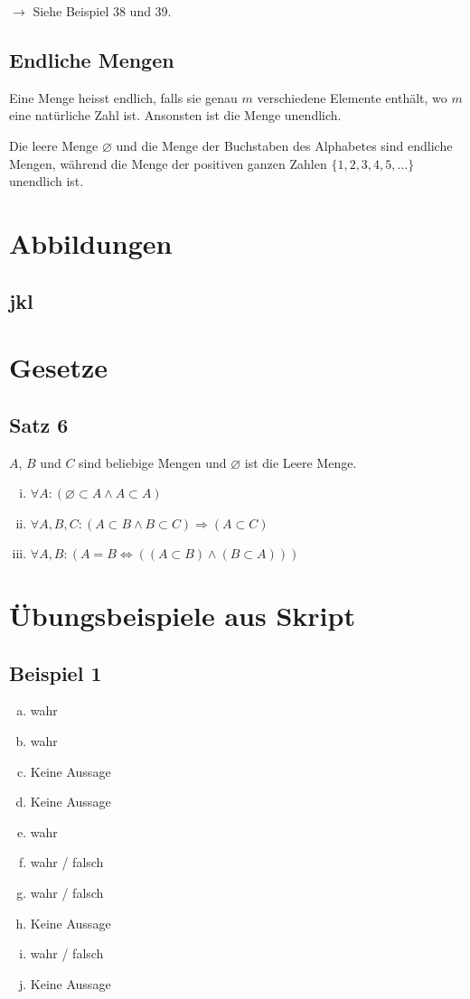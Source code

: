 \documentclass[12pt, a4paper, oneside]{article}
\begin{document}
$\rightarrow$ Siehe Beispiel 38 und 39.

\subsection{Endliche Mengen}
Eine Menge heisst endlich, falls sie genau $m$ verschiedene Elemente enthält, wo $m$ eine natürliche Zahl ist. Ansonsten ist die Menge unendlich.

Die leere Menge $\varnothing$ und die Menge der Buchstaben des Alphabetes sind endliche Mengen, während die Menge der positiven ganzen Zahlen $\{1, 2, 3, 4, 5,\dots\}$ unendlich ist.

\newpage
\section{Abbildungen}
\subsection{jkl}

%
%
\newpage
\section{Gesetze}
\subsection{Satz 6}
$A$, $B$ und $C$ sind beliebige Mengen und $\varnothing$ ist die Leere Menge.
\begin{enumerate}[(i)]
  \item $\forall A : (\varnothing \subset A \land A \subset A) $
  \item $\forall A, B, C : (A \subset B \land B \subset C) \Longrightarrow (A \subset C)$
  \item $\forall A, B : (A = B \Longleftrightarrow ((A \subset B) \land (B \subset A)))$
  
\end{enumerate}

\newpage 
\section{Übungsbeispiele aus Skript} 
\subsection{Beispiel 1}
\begin{enumerate}[(a)]
  \item wahr
  \item wahr
  \item Keine Aussage
  \item Keine Aussage
  \item wahr
  \item wahr / falsch
  \item wahr / falsch
  \item Keine Aussage
  \item wahr / falsch
  \item Keine Aussage
\end{enumerate}
\end{document}
